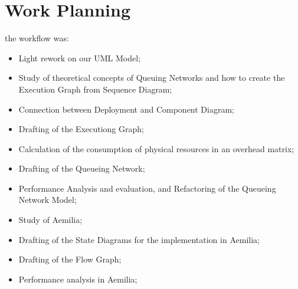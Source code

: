 \chapter{\textbf{Work Planning}}

the workflow was:

\begin{itemize}
	\item Light rework on our UML Model;
	\item Study of theoretical concepts of Queuing Networks and how to 			create the Execution Graph from Sequence Diagram;
	\item Connection between Deployment and Component Diagram;
	\item Drafting of the Executiong Graph;
	\item Calculation of the consumption of physical resources in an 			overhead matrix;
	\item Drafting of the Queueing Network;
	\item Performance Analysis and evaluation, and Refactoring of the 			Queueing Network Model;
	\item Study of Aemilia;
	\item Drafting of the State Diagrams for the implementation in 				Aemilia;
	\item Drafting of the Flow Graph;
	\item Performance analysis in Aemilia;	
\end{itemize}

